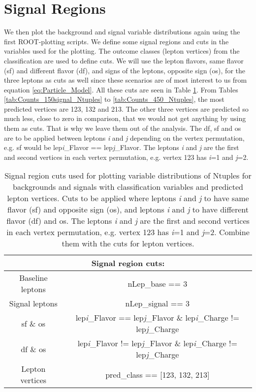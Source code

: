 \documentclass[a4paper, american, 12pt]{report}
\begin{document}
	\section{Signal Regions} 
	\label{sect:Result-SRDist}
	We then plot the background and signal variable distributions again using the first ROOT-plotting scripts. We define some signal regions and cuts in the variables used for the plotting. The outcome classes (lepton vertices) from the classification are used to define cuts. We will use the lepton flavors, same flavor (\acrshort{sf}) and different flavor (\acrshort{df}), and signs of the leptons, opposite sign (\acrshort{os}), for the three leptons as cuts as well since these scenarios are of most interest to us from equation \ref{eq:Particle_Model}. All these cuts are seen in Table \ref{tab:Cuts_class}. From Tables \ref{tab:Counts_150signal_Ntuples} to \ref{tab:Counts_450_Ntuples}, the most predicted vertices are 123, 132 and 213. The other three vertices are predicted so much less, close to zero in comparison, that we would not get anything by using them as cuts. That is why we leave them out of the analysis. The \acrshort{df}, \acrshort{sf} and \acrshort{os} are to be applied between leptons \textit{i} and \textit{j} depending on the vertex permutation, e.g. \acrshort{sf} would be lep\textit{i}\_Flavor == lep\textit{j}\_Flavor. The leptons \textit{i} and \textit{j} are the first and second vertices in each vertex permutation, e.g. vertex 123 has \textit{i}=1 and \textit{j}=2. 
	\begin{table}[h!]
		\centering
		\begin{tabular}{|c|c|}
			\hline
			\multicolumn{2}{|c|}{\textbf{Signal region cuts:}}\\
			\hline \rule{0pt}{13pt}
			Baseline leptons & nLep\_base == 3 \\
			Signal leptons & nLep\_signal == 3 \\
			\acrshort{sf} \& \acrshort{os} & lep\textit{i}\_Flavor == lep\textit{j}\_Flavor \& lep\textit{i}\_Charge != lep\textit{j}\_Charge\\
			\acrshort{df} \& \acrshort{os} & lep\textit{i}\_Flavor != lep\textit{j}\_Flavor \& lep\textit{i}\_Charge != lep\textit{j}\_Charge\\
			Lepton vertices & pred\_class == [123, 132, 213]\\
			\hline
		\end{tabular}
		\caption[Signal region cuts for Ntuples.]{Signal region cuts used for plotting variable distributions of Ntuples for backgrounds and signals with classification variables and predicted lepton vertices. Cuts to be applied where leptons \textit{i} and \textit{j} to have same flavor (\acrshort{sf}) and opposite sign (\acrshort{os}), and leptons \textit{i} and \textit{j} to have different flavor (\acrshort{df}) and \acrshort{os}. The leptons \textit{i} and \textit{j} are the first and second vertices in each vertex permutation, e.g. vertex 123 has \textit{i}=1 and \textit{j}=2. Combine them with the cuts for lepton vertices.}
		\label{tab:Cuts_class}
	\end{table}
	
\end{document}
